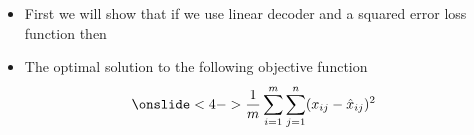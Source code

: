 \begin{frame}
    \begin{columns}
        \begin{overlayarea}{\textwidth}{\textheight}
            
        \end{overlayarea}


        \begin{overlayarea}{\textwidth}{\textheight}
            \begin{itemize}\justifying
                \item<2-> First we will show that if we use linear decoder and a squared error loss function then
                \item<3->The optimal solution to the following objective function 
                    \begin{align*}
                      \onslide<4-> {\frac{1}{m}\sum\limits_{i=1}^{m}\sum\limits_{j=1}^n(x_{ij}-\hat{x}_{ij})^2}
                    \end{align*}
            \end{itemize}
        \end{overlayarea}
    \end{columns}
\end{frame}


